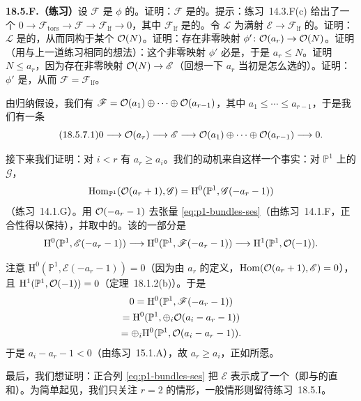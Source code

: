 \textbf{18.5.F.（练习）}\quad 设 $\mathscr{F}$ 是 $\phi$ 的\trCokernel。证明：$\mathscr{F}$ 是\trLocallyFree{}的。提示：\mbox{练习~14.3.F(c)} 给出了一个\trExactSequence{} $0\to\mathscr{F}_{\mathrm{tors}}\to\mathscr{F}\to\mathscr{F}_{\mathrm{lf}}\to 0$，其中 $\mathscr{F}_{\mathrm{lf}}$ 是\trLocallyFree{}的。令 $\mathscr{L}$ 为满射 $\mathscr{E}\to\mathscr{F}_{\mathrm{lf}}$ 的\trKernel。证明：$\mathscr{L}$ 是\trLocallyFree{}的，从而同构于某个 $\mathcal{O}(N)$。证明：存在非零映射 $\phi'\colon\mathcal{O}(a_r)\to\mathcal{O}(N)$。证明（用与上一道练习相同的想法）：这个非零映射 $\phi'$ 必是\trInjectiveMap，于是 $a_r\le N$。证明 $N\le a_r$，因为存在非零映射 $\mathcal{O}(N)\to\mathscr{E}$（回想一下 $a_r$ 当初是怎么选的）。证明：$\phi'$ 是\trIsomorphism，从而 $\mathscr{F}=\mathscr{F}_{\mathrm{lf}}$。

由归纳假设，我们有 $\mathscr{F}=\mathcal{O}(a_1)\oplus\cdots\oplus\mathcal{O}(a_{r-1})$，其中 $a_1\le\cdots\le a_{r-1}$，于是我们有一条\trShortExactSequence
\begin{equation*}\tag{18.5.7.1}\label{eq:p1-bundles-ses}
0\longrightarrow\mathcal{O}(a_r)\longrightarrow\mathscr{E}\longrightarrow\mathcal{O}(a_1)\oplus\cdots\oplus\mathcal{O}(a_{r-1})\longrightarrow 0.
\end{equation*}

接下来我们证明：对 $i<r$ 有 $a_r\ge a_i$。我们的动机来自这样一个事实：对 $\mathbb{P}^1$ 上的\trQCSheaf{} $\mathscr{G}$，
\[
\operatorname{Hom}_{\mathbb{P}^1}(\mathcal{O}(a_r+1),\mathscr{G})=\mathrm{H}^0(\mathbb{P}^1,\mathscr{G}(-a_r-1))
\]
（\mbox{练习~14.1.G}）。用 $\mathcal{O}(-a_r-1)$ 去张量 \eqref{eq:p1-bundles-ses}（由\mbox{练习~14.1.F}，正合性得以保持），并取\trCohomology{}中的\trLongExactSequence。该\trLongExactSequence{}的一部分是
\[
\mathrm{H}^0(\mathbb{P}^1,\mathscr{E}(-a_r-1))\longrightarrow\mathrm{H}^0(\mathbb{P}^1,\mathscr{F}(-a_r-1))\longrightarrow\mathrm{H}^1(\mathbb{P}^1,\mathcal{O}(-1)).
\]

注意 $\mathrm{H}^0(\mathbb{P}^1,\mathscr{E}(-a_r-1))=0$（因为由 $a_r$ 的定义，$\operatorname{Hom}(\mathcal{O}(a_r+1),\mathscr{E})=0$），且 $\mathrm{H}^1(\mathbb{P}^1,\mathcal{O}(-1))=0$（\mbox{定理~18.1.2(b)}）。于是
\[
\begin{gathered}
0=\mathrm{H}^0(\mathbb{P}^1,\mathscr{F}(-a_r-1))\\
=\mathrm{H}^0(\mathbb{P}^1,\oplus_i\mathcal{O}(a_i-a_r-1))\\
=\oplus_i\mathrm{H}^0(\mathbb{P}^1,\mathcal{O}(a_i-a_r-1)).
\end{gathered}
\]
于是 $a_i-a_r-1<0$（由\mbox{练习~15.1.A}），故 $a_r\ge a_i$，正如所愿。

最后，我们想证明：正合列 \eqref{eq:p1-bundles-ses} 把 $\mathscr{E}$ 表示成了一个\trDirectSum（即\trSubsheaf{}与\trQuotientSheaf{}的直和）。为简单起见，我们只关注 $r=2$ 的情形，一般情形则留待\mbox{练习~18.5.I}。

